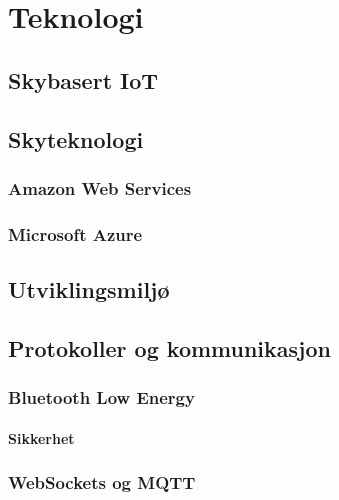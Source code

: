 \chapter{Teknologi}
\label{ch:technology}
\blindtext

\section{Skybasert IoT}
\blindtext

\section{Skyteknologi}
\blindtext
\subsection{Amazon Web Services}
\blindtext
\subsection{Microsoft Azure}
\blindtext

\section{Utviklingsmiljø}
\blindtext

\section{Protokoller og kommunikasjon}
\blindtext
\subsection{Bluetooth Low Energy}

\subsubsection{Sikkerhet}

\blindtext
\subsection{WebSockets og MQTT}
\blindtext
